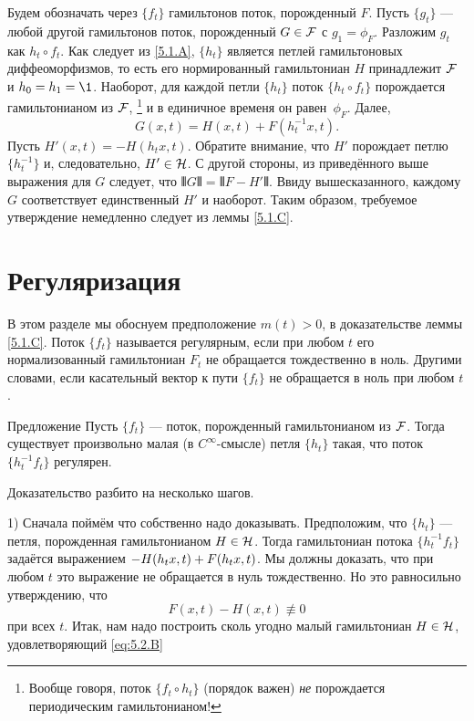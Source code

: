 Будем обозначать через $\{f_t\}$ гамильтонов поток, порожденный $F$.
Пусть $\{g_t\}$ --- любой другой гамильтонов поток, порожденный $G \in \mathcal{F}$ с $g_1 = \phi_F$.
Разложим $g_t$ как $h_t \circ f_t$.
Как следует из \ref{5.1.A}, $\{h_t\}$ является петлей гамильтоновых диффеоморфизмов, то есть его нормированный гамильтониан $H$ принадлежит $\mathcal{F}$ и $h_0 = h_1 = \1$.
Наоборот, для каждой петли $\{h_t\}$ поток $\{h_t \circ f_t\}$ порождается гамильтонианом из $\mathcal{F}$,%
\footnote{Вообще говоря, поток $\{f_t \circ h_t\}$ (порядок важен) {}\emph{не} порождается периодическим гамильтонианом!}
и в единичное временя он равен~$\phi_F$.
Далее, 
\[G (x, t) = H (x, t) + F (h^{-1}_t x, t).\]
Пусть $H' (x, t) = -H (h_t x, t)$.
Обратите внимание, что $H'$ порождает петлю $\{h^{-1}_t\}$ и, следовательно, $H'\in\mathcal{H}$.
С другой стороны, из приведённого выше выражения для $G$ следует, что $\VERT G \VERT = \VERT F - H' \VERT$.
Ввиду вышесказанного, каждому $G$ соответствует единственный $H'$ и наоборот.
Таким образом, требуемое утверждение немедленно следует из леммы \ref{5.1.C}.

\section{Регуляризация}\label{5.2}

В этом разделе мы обоснуем предположение $m(t)>0$, в доказательстве леммы \ref{5.1.C}.
Поток $\{f_t\}$ называется регулярным, если при любом $t$ его нормализованный гамильтониан $F_t$ не обращается тождественно в ноль.
Другими словами, если касательный вектор к пути $\{f_t\}$ не обращается в ноль при любом $t$.

\begin{thm}{Предложение}\label{5.2.A}
Пусть $\{f_t\}$ --- поток, порожденный гамильтонианом из $\mathcal{F}$.
Тогда существует произвольно малая (в $C^\infty$-смысле) петля $\{h_t\}$ такая, что поток $\{h^{-1}_t f_t\}$ регулярен.
\end{thm}

Доказательство разбито на несколько шагов.

1) Сначала поймём что собственно надо доказывать.
Предположим, что $\{h_t\}$ --- петля, порожденная гамильтонианом $H \in \mathcal{H}$.
Тогда гамильтониан потока $\{h^{-1}_t f_t\}$ задаётся выражением $-H (h_t x, t) \z+ F (h_t x, t)$.
Мы должны доказать, что при любом $t$ это выражение не обращается в нуль тождественно.
Но это равносильно утверждению, что
\begin{equation}
F (x, t) - H (x, t) \not\equiv 0\label{eq:5.2.B}
\end{equation}
при всех $t$.
Итак, нам надо построить сколь угодно малый гамильтониан $H \in \mathcal{H}$, удовлетворяющий \ref{eq:5.2.B}

